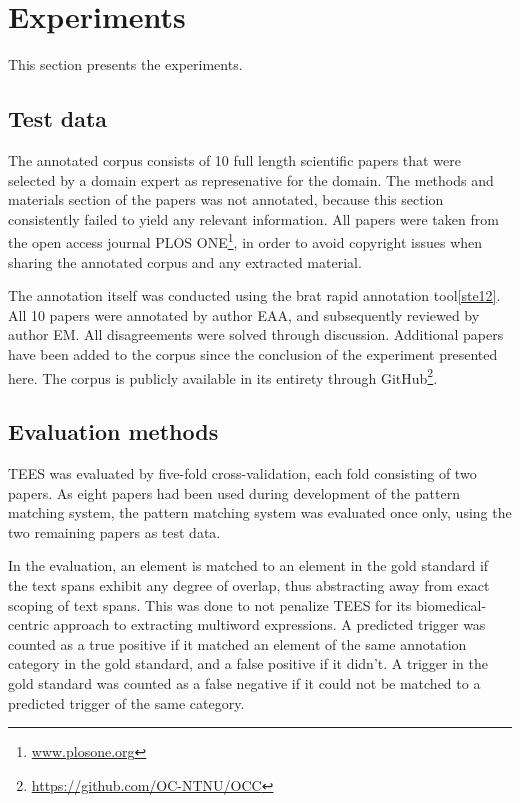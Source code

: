 \section{Experiments}

This section presents the experiments. 

\subsection{Test data}

The annotated corpus consists of 10 full length scientific papers that were selected by a domain expert as represenative for the domain. The methods and materials section of the papers was not annotated, because this section consistently failed to yield any relevant information. All papers were taken from the open access journal PLOS ONE\footnote{\url{www.plosone.org}}, in order to avoid copyright issues when sharing the annotated corpus and any extracted material. 

The annotation itself was conducted using the brat rapid annotation tool\ref{ste12}. All 10 papers were annotated by author EAA, and subsequently reviewed by author EM. All disagreements were solved through discussion. Additional papers have been added to the corpus since the conclusion of the experiment presented here. The corpus is publicly available in its entirety through GitHub\footnote{\url{https://github.com/OC-NTNU/OCC}}.

\subsection{Evaluation methods}

TEES was evaluated by five-fold cross-validation, each fold consisting of two papers. As eight papers had been used during development of the pattern matching system, the pattern matching system was evaluated once only, using the two remaining papers as test data.

In the evaluation, an element is matched to an element in the gold standard if the text spans exhibit any degree of overlap, thus abstracting away from exact scoping of text spans. This was done to not penalize TEES for its biomedical-centric approach to extracting multiword expressions. A predicted trigger was counted as a true positive if it matched an element of the same annotation category in the gold standard, and a false positive if it didn't. A trigger in the gold standard was counted as a false negative if it could not be matched to a predicted trigger of the same category. 

